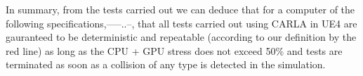 



\noindent In summary, from the tests carried out we can deduce that for a computer of the following specifications,-----..--, that all tests carried out using CARLA in UE4 are gauranteed to be deterministic and repeatable (according to our definition by the red line) as long as the CPU + GPU stress does not exceed 50\% and tests are terminated as soon as a collision of any type is detected in the simulation. 